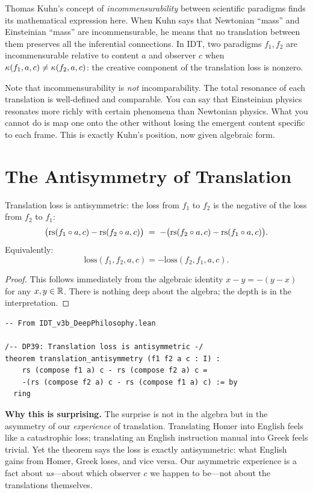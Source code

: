 Thomas Kuhn's concept of \emph{incommensurability} between scientific paradigms
finds its mathematical expression here.  When Kuhn says that Newtonian ``mass''
and Einsteinian ``mass'' are incommensurable, he means that no translation
between them preserves all the inferential connections.  In IDT, two paradigms
$f_1, f_2$ are incommensurable relative to content $a$ and observer $c$ when
$\kappa(f_1, a, c) \neq \kappa(f_2, a, c)$: the creative component of
the translation loss is nonzero.

Note that incommensurability is \emph{not} incomparability.  The total resonance
of each translation is well-defined and comparable.  You can say that Einsteinian
physics resonates more richly with certain phenomena than Newtonian physics.
What you cannot do is map one onto the other without losing the emergent
content specific to each frame.  This is exactly Kuhn's position, now given
algebraic form.

\section{The Antisymmetry of Translation}

\begin{theorem}
\label{thm:translation-antisymmetry}
Translation loss is antisymmetric: the loss from $f_1$ to $f_2$ is the
negative of the loss from $f_2$ to $f_1$:
\[
\bigl(\mathrm{rs}(f_1 \circ a, c) - \mathrm{rs}(f_2 \circ a, c)\bigr)
\;=\;
-\bigl(\mathrm{rs}(f_2 \circ a, c) - \mathrm{rs}(f_1 \circ a, c)\bigr).
\]
Equivalently:
\[
\mathrm{loss}(f_1, f_2, a, c) = -\mathrm{loss}(f_2, f_1, a, c).
\]
\end{theorem}

\begin{proof}
This follows immediately from the algebraic identity $x - y = -(y - x)$ for
any $x, y \in \mathbb{R}$.  There is nothing deep about the algebra; the depth is in
the interpretation.
\end{proof}

\begin{lstlisting}
-- From IDT_v3b_DeepPhilosophy.lean

/-- DP39: Translation loss is antisymmetric -/
theorem translation_antisymmetry (f1 f2 a c : I) :
    rs (compose f1 a) c - rs (compose f2 a) c =
    -(rs (compose f2 a) c - rs (compose f1 a) c) := by
  ring
\end{lstlisting}

\begin{surprisebox}
\noindent\textbf{Why this is surprising.}
The surprise is not in the algebra but in the asymmetry of our
\emph{experience} of translation.  Translating Homer into English feels like
a catastrophic loss; translating an English instruction manual into Greek
feels trivial.  Yet the theorem says the loss is exactly antisymmetric: what
English gains from Homer, Greek loses, and vice versa.  Our asymmetric
experience is a fact about \emph{us}---about which observer $c$ we happen to
be---not about the translations themselves.
\end{surprisebox}

